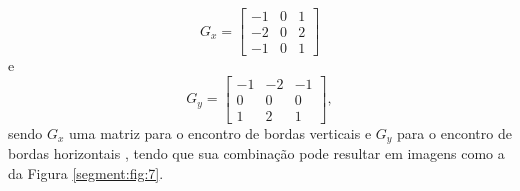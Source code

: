 \begin{equation}
\label{segment:eq:4}
    G_x = \begin{bmatrix}
    -1 & 0 & 1 \\ 
    -2 & 0 & 2 \\ 
    -1 & 0 & 1
    \end{bmatrix}
\end{equation}
e
\begin{equation}
\label{segment:eq:5}
    G_y = \begin{bmatrix}
    -1 & -2 & -1 \\ 
     0 & 0 & 0 \\ 
     1 & 2 & 1
    \end{bmatrix},
\end{equation}
sendo $G_x$ uma matriz para o encontro de bordas verticais e $G_y$ para o encontro de bordas horizontais \citep{pedrini2008analise}, tendo que sua combinação pode resultar em imagens como a da Figura \ref{segment:fig:7}.

